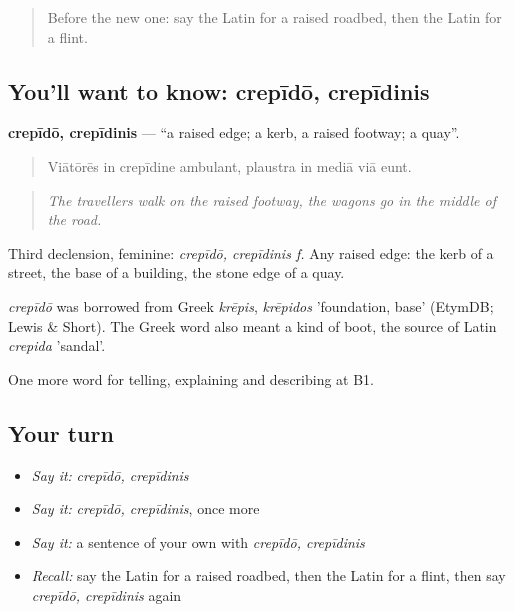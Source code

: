 \label{lesson:LA-C425-crepido}



\begin{quote}
Before the new one: say the Latin for a raised roadbed, then the Latin for a flint.
\end{quote}

\subsection*{You'll want to know: crepīdō, crepīdinis}
\textbf{crepīdō, crepīdinis} — \textquotedblleft{}a raised edge; a kerb, a raised footway; a quay\textquotedblright{}.

\begin{quote}
Viātōrēs in crepīdine ambulant, plaustra in mediā viā eunt.
\end{quote}

\begin{quote}
\emph{The travellers walk on the raised footway, the wagons go in the middle of the road.}
\end{quote}

Third declension, feminine: \emph{crepīdō, crepīdinis f.} Any raised edge: the kerb of a street, the base of a building, the stone edge of a quay.

\begin{cousinweb}
\emph{crepīdō} was borrowed from Greek \emph{krēpis}, \emph{krēpidos} 'foundation, base' (EtymDB; Lewis \& Short). The Greek word also meant a kind of boot, the source of Latin \emph{crepida} 'sandal'.
\end{cousinweb}

\begin{grammarlens}[title={What you've built}]
One more word for telling, explaining and describing at B1.
\end{grammarlens}

\subsection*{Your turn}
\begin{itemize}
\raggedright
  \item \emph{Say it:} \emph{crepīdō, crepīdinis}
  \item \emph{Say it:} \emph{crepīdō, crepīdinis}, once more
  \item \emph{Say it:} a sentence of your own with \emph{crepīdō, crepīdinis}
  \item \emph{Recall:} say the Latin for a raised roadbed, then the Latin for a flint, then say \emph{crepīdō, crepīdinis} again
\end{itemize}


